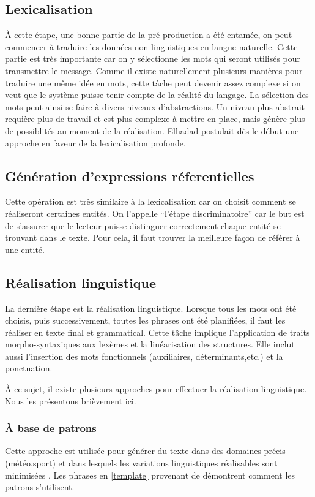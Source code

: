 \subsection{Lexicalisation}
À cette étape, une bonne partie de la pré-production a été entamée, on peut commencer à traduire les données non-linguistiques en langue naturelle. Cette partie est très importante car on y sélectionne les mots qui seront utilisés pour transmettre le message. Comme il existe naturellement plusieurs manières pour traduire une même idée en mots, cette tâche peut devenir assez complexe si on veut que le système puisse tenir compte de la réalité du langage. La sélection des mots peut ainsi se faire à divers niveaux d'abstractions. Un niveau plus abstrait requière plus de travail et est plus complexe à mettre en place, mais génère plus de possiblités au moment de la réalisation. Elhadad \cite{ElhadadFloatingConstraintsLexical1997} postulait dès le début une approche en faveur de la lexicalisation profonde.

\subsection{Génération d'expressions réferentielles}
Cette opération est très similaire à la lexicalisation car on choisit comment se réaliseront certaines entités. On l'appelle "`l'étape discriminatoire"' car le but est de s'assurer que le lecteur puisse distinguer correctement chaque entité se trouvant dans le texte. Pour cela, il faut trouver la meilleure façon de référer à une entité.

\subsection{Réalisation linguistique}\label{real}
La dernière étape est la réalisation linguistique. Lorsque tous les mots ont été choisis, puis successivement, toutes les phrases ont été planifiées, il faut les réaliser en texte final et grammatical. Cette tâche implique l'application de traits morpho-syntaxiques aux lexèmes et la linéarisation des structures. Elle inclut aussi l'insertion des mots fonctionnels (auxiliaires, déterminants,etc.) et la ponctuation.

À ce sujet, il existe plusieurs approches pour effectuer la réalisation linguistique. Nous les présentons brièvement ici.

\subsubsection{À base de patrons}
Cette approche est utilisée pour générer du texte dans des domaines précis (météo,sport) et dans lesquels les variations linguistiques réalisables sont minimisées \citep{mcroy_channarukul_ali_2003}. Les phrases en \ref{template} provenant de \cite{gatt18} démontrent comment les patrons s'utilisent.


